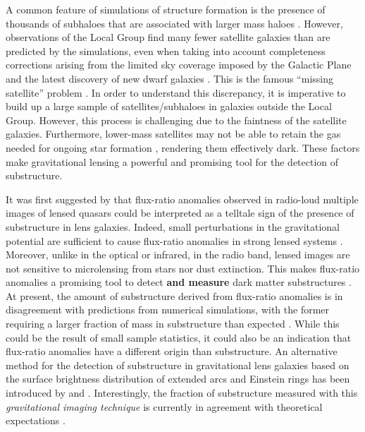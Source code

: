 \documentclass[useAMS,usenatbib]{mn2e}
\begin{document}
A common feature of simulations of structure formation is the presence
of thousands of subhaloes that are associated with larger mass haloes \citep[e.g.][]{Springel08}.
However, observations of the Local Group find many fewer satellite
galaxies than are predicted by the simulations, even when taking into
account completeness corrections arising from the limited sky coverage
imposed by the Galactic Plane and the latest discovery of new dwarf galaxies \citep{DES15,Kop15}.  
This is the famous ``missing satellite'' problem \citep{Klypin1999, Moore1999, S07}. In order to
understand this discrepancy, it is imperative to build up a large
sample of satellites/subhaloes in galaxies outside the Local Group.
 However, this process is challenging due to the faintness of the satellite
galaxies.  Furthermore, lower-mass satellites may not be able to
retain the gas needed for ongoing star formation \citep[e.g.,][]{P11},
rendering them effectively dark.  These factors make gravitational
lensing a powerful and promising tool for the detection of
substructure.

It was first suggested by \citet{Mao1998} that flux-ratio anomalies
observed in radio-loud multiple images of lensed quasars could be
interpreted as a telltale sign of the presence of substructure in lens
galaxies.  Indeed, small perturbations in the gravitational potential
are sufficient to cause flux-ratio anomalies in strong lensed systems
\citep{Bradac02}.  Moreover, unlike in the optical or infrared, in the
radio band, lensed images are not sensitive to microlensing from
stars nor dust extinction. This makes flux-ratio anomalies a promising
tool to detect \textbf{and measure} dark matter substructures \citep{Dalal2002}.  At
present, the amount of substructure derived from flux-ratio anomalies
is in disagreement with predictions from numerical simulations, with
the former requiring a larger fraction of mass in substructure than
expected \citep{Xu14}. While this could be the result of small sample
statistics, it could also be an indication that flux-ratio anomalies
have a different origin than substructure.
%
An alternative method for
the detection of substructure in gravitational lens galaxies based on
the surface brightness distribution of extended arcs and Einstein rings
has been introduced by \citet{K05} and \citet{V09}. Interestingly, the fraction of
substructure measured with this \emph{gravitational imaging technique}
is currently in agreement with theoretical expectations \citep{V14a,V12}.
\end{document}

